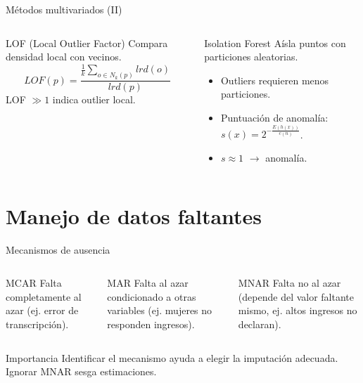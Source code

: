 \documentclass[aspectratio=169, 10pt, xcolor=table]{beamer}
\begin{document}
\begin{frame}{Métodos multivariados (II)}
    \begin{columns}[t]
        \begin{block}{LOF (Local Outlier Factor)}
            Compara densidad local con vecinos.
            \[
            LOF(p) = \frac{\frac{1}{k}\sum_{o\in N_k(p)} lrd(o)}{lrd(p)}
            \]
            LOF $\gg 1$ indica outlier local.
        \end{block}
        \begin{block}{Isolation Forest}
            Aísla puntos con particiones aleatorias.
            \begin{itemize}
                \item Outliers requieren menos particiones.
                \item Puntuación de anomalía: $s(x)=2^{-\frac{E(h(x))}{c(n)}}$.
                \item $s \approx 1$ $\rightarrow$ anomalía.
            \end{itemize}
        \end{block}
    \end{columns}
\end{frame}

\section{Manejo de datos faltantes}

\begin{frame}{Mecanismos de ausencia}
    \begin{columns}[t]
        \begin{block}{MCAR}
            Falta completamente al azar (ej. error de transcripción).
        \end{block}
        \begin{block}{MAR}
            Falta al azar condicionado a otras variables (ej. mujeres no responden ingresos).
        \end{block}
        \begin{block}{MNAR}
            Falta no al azar (depende del valor faltante mismo, ej. altos ingresos no declaran).
        \end{block}
    \end{columns}
    \vspace{0.3cm}
    \begin{alertblock}{Importancia}
        Identificar el mecanismo ayuda a elegir la imputación adecuada. Ignorar MNAR sesga estimaciones.
    \end{alertblock}
\end{frame}
\end{document}
